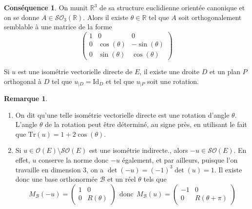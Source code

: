 \documentclass[french]{article}
\newcommand{\R}{\mathbb{R}}
\newcommand{\Tr}{\text{Tr}}
\theoremstyle{plain}
\theoremstyle{definition}
\newtheorem*{rmq}{Remarque}
\newtheorem*{conséquence}{Conséquence}
\theoremstyle{remark}
\begin{document}
\begin{conséquence}
	On munit $\R^3$ de sa structure euclidienne orientée canonique et on se donne $A\in\mathcal{SO}_3(\R)$. Alors il existe $\theta\in\R$ tel que $A$ soit orthogonalement semblable à une matrice de la forme $$\begin{pmatrix}
	1&0&0\\
	0&\cos(\theta)&-\sin(\theta)\\
	0&\sin(\theta)&\cos(\theta)
\end{pmatrix}$$
\end{conséquence}

\begin{cor}
	Si $u$ est une isométrie vectorielle directe de $E$, il existe une droite $D$ et un plan $P$ orthogonal à $D$ tel que $u_{\mid D}=\text{Id}_{D}$ et tel que $u_{\mid P}$ soit une rotation.
\end{cor}

\begin{rmq}
	\begin{enumerate}
		\item On dit qu'une telle isométrie vectorielle directe est une rotation d'angle $\theta$. L'angle $\theta$ de la rotation peut être déterminé, au signe près, en utilisant le fait que $\Tr(u)=1+2\cos(\theta)$.
		\item Si $u\in\mathcal{O}(E)\setminus\mathcal{SO}(E)$ est une isométrie indirecte., alors $-u\in\mathcal{SO}(E)$. En effet, $u$ conserve la norme donc $-u$ également, et par ailleurs, puisque l'on travaille en dimension $3$, on a $\det(-u)=(-1)^3\det(u)=1$. Il existe donc une base orthonormée $\mathcal{B}$ et un réel $\theta$ tels que $$M_\mathcal{B}(-u)=\begin{pmatrix}
			1&0\\
			0&R(\theta)
		\end{pmatrix} \ \ \text{donc}\ \ M_\mathcal{B}(u)=\begin{pmatrix}
		-1&0\\
		0&R(\theta+\pi)
		\end{pmatrix}$$
	\end{enumerate}
\end{rmq}
\end{document}
